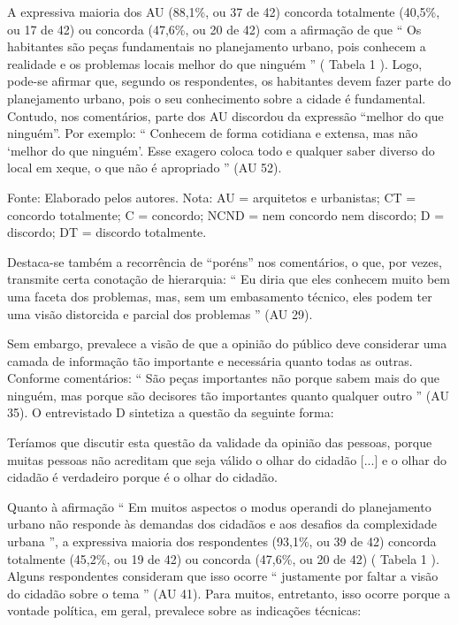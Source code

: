 \documentclass{article}
\begin{document}
A expressiva maioria dos AU (88,1\%, ou 37 de 42) concorda totalmente (40,5\%, ou
					17 de 42) ou concorda (47,6\%, ou 20 de 42) com a afirmação de que “%
Os
						habitantes são peças fundamentais no planejamento urbano, pois conhecem a
						realidade e os problemas locais melhor do que ninguém%
” (%
Tabela 1%
). Logo, pode-se afirmar que,
					segundo os respondentes, os habitantes devem fazer parte do planejamento urbano,
					pois o seu conhecimento sobre a cidade é fundamental. Contudo, nos comentários,
					parte dos AU discordou da expressão “melhor do que ninguém”. Por exemplo:
						“%
Conhecem de forma cotidiana e extensa, mas não ‘melhor do que
						ninguém’. Esse exagero coloca todo e qualquer saber diverso do local em
						xeque, o que não é apropriado%
” (AU 52).

Fonte: Elaborado pelos autores. Nota: AU = arquitetos e urbanistas;
								CT = concordo totalmente; C = concordo; NCND = nem concordo nem
								discordo; D = discordo; DT = discordo totalmente.

Destaca-se também a recorrência de “poréns” nos comentários, o que, por vezes,
					transmite certa conotação de hierarquia: “%
Eu diria que eles conhecem
						muito bem uma faceta dos problemas, mas, sem um embasamento técnico, eles
						podem ter uma visão distorcida e parcial dos problemas%
” (AU
					29).

Sem embargo, prevalece a visão de que a opinião do público deve considerar uma
					camada de informação tão importante e necessária quanto todas as outras.
					Conforme comentários: “%
São peças importantes não porque sabem mais do
						que ninguém, mas porque são decisores tão importantes quanto qualquer
						outro%
” (AU 35). O entrevistado D sintetiza a questão da seguinte
					forma: 

Teríamos que discutir esta questão da validade da opinião das pessoas, porque
						muitas pessoas não acreditam que seja válido o olhar do cidadão
[...]%
 e o olhar do cidadão é verdadeiro porque é o
						olhar do cidadão.

Quanto à afirmação “%
Em muitos aspectos o modus operandi do planejamento
						urbano não responde às demandas dos cidadãos e aos desafios da complexidade
						urbana%
”, a expressiva maioria dos respondentes (93,1\%, ou 39 de 42)
					concorda totalmente (45,2\%, ou 19 de 42) ou concorda (47,6\%, ou 20 de 42) (%
Tabela 1%
). Alguns respondentes consideram
					que isso ocorre “%
justamente por faltar a visão do cidadão sobre o
						tema%
” (AU 41). Para muitos, entretanto, isso ocorre porque a
					vontade política, em geral, prevalece sobre as indicações técnicas: 
\end{document}
